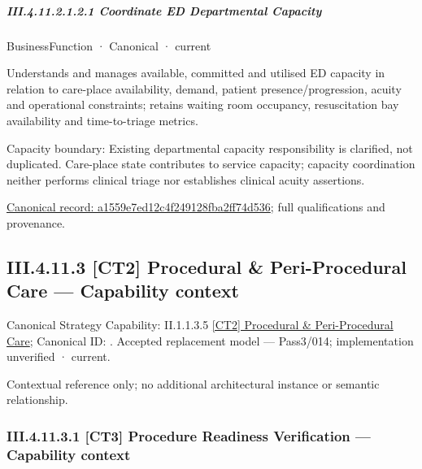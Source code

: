 \subparagraph*{III.4.11.2.1.2.1 Coordinate ED Departmental Capacity}
\label{navigation:III.4.11.2.1.2.1}

\label{element:a1559e7ed12c4f249128fba2ff74d536}
{\small BusinessFunction · Canonical · current}\par

Understands and manages available, committed and utilised ED capacity in relation to care-place availability, demand, patient presence/progression, acuity and operational constraints; retains waiting room occupancy, resuscitation bay availability and time-to-triage metrics.



Capacity boundary: Existing departmental capacity responsibility is clarified, not duplicated. Care-place state contributes to service capacity; capacity coordination neither performs clinical triage nor establishes clinical acuity assertions.


{\footnotesize \href{../../../../../../../continuum/business/business-function/a1559e7ed12c4f249128fba2ff74d536.md}{Canonical record: a1559e7ed12c4f249128fba2ff74d536}; full qualifications and provenance.}\par
\subsection*{III.4.11.3 [CT2] Procedural \& Peri-Procedural Care — Capability context}
\label{navigation:III.4.11.3}

{\small Canonical Strategy Capability: II.1.1.3.5 \hyperref[element:2f1e08ecaf7e4d589582c26d7e8966f1]{[CT2] Procedural \& Peri-Procedural Care}; Canonical ID: \texttt{}. Accepted replacement model — Pass3/014; implementation unverified · current.}\par
Contextual reference only; no additional architectural instance or semantic relationship.\par
\subsubsection*{III.4.11.3.1 [CT3] Procedure Readiness Verification — Capability context}
\label{navigation:III.4.11.3.1}

